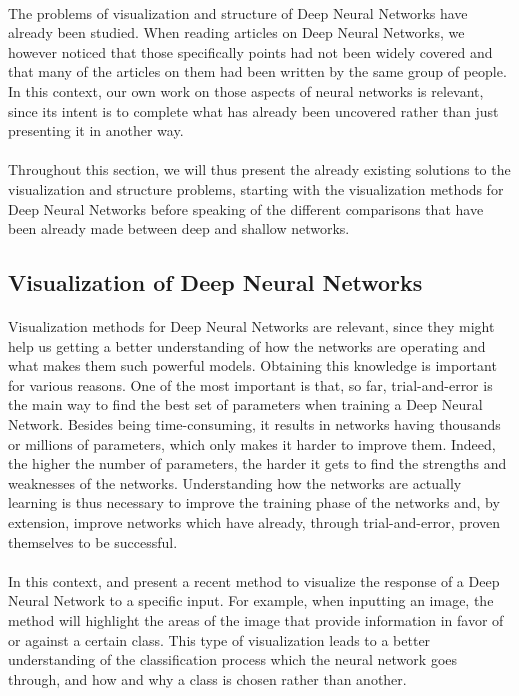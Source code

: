 \documentclass[a4paper]{article}
\begin{document}
\paragraph{}The problems of visualization and structure of Deep Neural Networks have already been studied. When reading articles on Deep Neural Networks, we however noticed that those specifically points had not been widely covered and that many of the articles on them had been written by the same group of people. In this context, our own work on those aspects of neural networks is relevant, since its intent is to complete what has already been uncovered rather than just presenting it in another way. 

\paragraph{}Throughout this section, we will thus present the already existing solutions to the visualization and structure problems, starting with the visualization methods for Deep Neural Networks before speaking of the different comparisons that have been already made between deep and shallow networks.  


\subsection{Visualization of Deep Neural Networks}
\paragraph{}Visualization methods for Deep Neural Networks are relevant, since they might help us getting a better understanding of how the networks are operating and what makes them such powerful models. Obtaining this knowledge is important for various reasons. One of the most important is that, so far, trial-and-error is the main way to find the best set of parameters when training a Deep Neural Network. Besides being time-consuming, it results in networks having thousands or millions of parameters, which only makes it harder to improve them. Indeed, the higher the number of parameters, the harder it gets to find the strengths and weaknesses of the networks. Understanding how the networks are actually learning is thus necessary to improve the training phase of the networks and, by extension, improve networks which have already, through trial-and-error, proven themselves to be successful.

\paragraph{}In this context, \citep{ZintgrafICLR2017} and \citep{Zintgraf2017} present a recent method to visualize the response of a Deep Neural Network to a specific input. For example, when inputting an image, the method will highlight the areas of the image that provide information in favor of or against a certain class. This type of visualization leads to a better understanding of the classification process which the neural network goes through, and how and why a class is chosen rather than another. 
\end{document}
